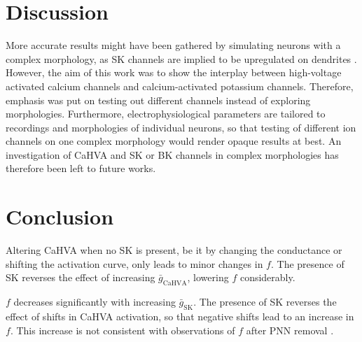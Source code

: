 \documentclass[times, twoside]{zHenriquesLab-StyleBioRxiv}
\begin{document}
\begin{table} %
    \centering
    \caption{Default conductances used in Figure \ref{fig:allmodels_fI_appendix}. Note that some conductances have been changed a bit due to the change in morphology.} %
\end{table}

\section*{Discussion}
More accurate results might have been gathered by simulating neurons with a complex morphology, as SK channels are implied to be upregulated on dendrites \cite{dembitskaya_attenuation_2021}. However, the aim of this work was to show the interplay between high-voltage activated calcium channels and calcium-activated potassium channels. Therefore, emphasis was put on testing out different channels instead of exploring morphologies. Furthermore, electrophysiological parameters are tailored to recordings and morphologies of individual neurons, so that testing of different ion channels on one complex morphology would render opaque results at best. An investigation of CaHVA and SK or BK channels in complex morphologies has therefore been left to future works. %

\section*{Conclusion}
Altering CaHVA when no SK is present, be it by changing the conductance or shifting the activation curve, only leads to minor changes in $f$. The presence of SK reverses the effect of increasing $\bar{g}_\text{CaHVA}$, lowering $f$ considerably. %

$f$ decreases significantly with increasing $\bar{g}_\text{SK}$. The presence of SK reverses the effect of shifts in CaHVA activation, so that negative shifts lead to an increase in $f$. This increase is not consistent with observations of $f$ after PNN removal \cite{tewari_perineuronal_2018}.


\printbibliography
\end{document}
